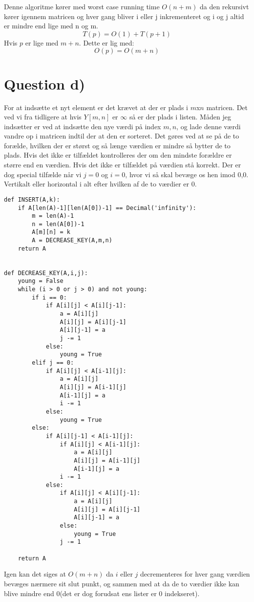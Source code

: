 \documentclass[a4paper, 12pt]{article}
\begin{document}
Denne algoritme kører med worst case running time $O(n+m)$ da den rekursivt kører igennem matricen
og hver gang bliver i eller j inkrementeret og i og j altid er mindre end lige med n og m. \\
\begin{equation}
T(p) = O(1) + T(p+1)
\end{equation}
Hvis $p$ er lige med $m+n$.
Dette er lig med:
\begin{equation}
O(p) = O(m+n)
\end{equation}

\section*{Question d)}
For at indsætte et nyt element er det krævet at der er plads i $m$x$n$ matricen.
Det ved vi fra tidligere at hvis $Y[m,n]$ er $\infty$ så er der plads i listen.
Måden jeg indsætter er ved at indsætte den nye værdi på index $m,n$, og lade
denne værdi vandre op i matricen indtil der at den er sorteret.
Det gøres ved at se på de to forælde, hvilken der er størst og så længe værdien
er mindre så bytter de to plads. Hvis det ikke er tilfældet kontrolleres
der om den mindste forældre er større end en værdien. Hvis det ikke er tilfældet
på værdien stå korrekt. Der er dog special tilfælde når vi $j = 0$ og $i = 0$,
hvor vi så skal bevæge os hen imod 0,0. Vertikalt eller horizontal i alt efter
hvilken af de to værdier er 0.
\label{Python kode til INSERT funktion på young tabulars}
\begin{lstlisting}
def INSERT(A,k):
	if A[len(A)-1][len(A[0])-1] == Decimal('infinity'):
		m = len(A)-1
		n = len(A[0])-1 
		A[m][n] = k	
		A = DECREASE_KEY(A,m,n)	
	return A


def DECREASE_KEY(A,i,j):	
	young = False
	while (i > 0 or j > 0) and not young:
		if i == 0:
			if A[i][j] < A[i][j-1]:
				a = A[i][j]
				A[i][j] = A[i][j-1]
				A[i][j-1] = a
				j -= 1
			else:
				young = True
		elif j == 0:
			if A[i][j] < A[i-1][j]:
				a = A[i][j]
				A[i][j] = A[i-1][j]
				A[i-1][j] = a
				i -= 1
			else:
				young = True
		else:
			if A[i][j-1] < A[i-1][j]:
				if A[i][j] < A[i-1][j]:
					a = A[i][j]
					A[i][j] = A[i-1][j]
					A[i-1][j] = a
				i -= 1
			else:
				if A[i][j] < A[i][j-1]:
					a = A[i][j]
					A[i][j] = A[i][j-1]
					A[i][j-1] = a
				else:
					young = True
				j -= 1
				
	return A
\end{lstlisting}
Igen kan det siges at $O(m+n)$ da $i$ eller $j$ decrementeres for hver gang værdien bevæges nærmere sit slut punkt,
og sammen med at da de to værdier ikke kan blive mindre end 0(det er dog forudsat ens lister er 0 indekseret).
\end{document}
